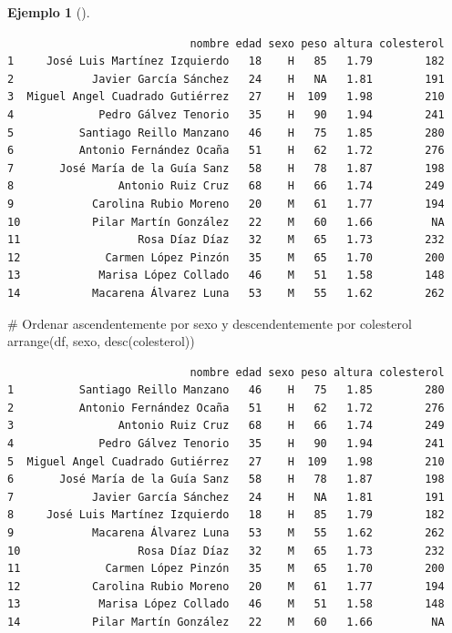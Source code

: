 \documentclass[
  a4paper,
]{scrreport}
\newenvironment{Shaded}{\begin{snugshade}}{\end{snugshade}}
\newcommand{\CommentTok}[1]{\textcolor[rgb]{0.37,0.37,0.37}{#1}}
\newcommand{\FunctionTok}[1]{\textcolor[rgb]{0.28,0.35,0.67}{#1}}
\newcommand{\NormalTok}[1]{\textcolor[rgb]{0.00,0.23,0.31}{#1}}
\theoremstyle{definition}
\theoremstyle{definition}
\newtheorem{example}{Ejemplo}[chapter]
\theoremstyle{remark}
\begin{document}
\begin{example}[]
\begin{verbatim}
                            nombre edad sexo peso altura colesterol
1     José Luis Martínez Izquierdo   18    H   85   1.79        182
2            Javier García Sánchez   24    H   NA   1.81        191
3  Miguel Angel Cuadrado Gutiérrez   27    H  109   1.98        210
4             Pedro Gálvez Tenorio   35    H   90   1.94        241
5          Santiago Reillo Manzano   46    H   75   1.85        280
6          Antonio Fernández Ocaña   51    H   62   1.72        276
7       José María de la Guía Sanz   58    H   78   1.87        198
8                Antonio Ruiz Cruz   68    H   66   1.74        249
9            Carolina Rubio Moreno   20    M   61   1.77        194
10           Pilar Martín González   22    M   60   1.66         NA
11                  Rosa Díaz Díaz   32    M   65   1.73        232
12             Carmen López Pinzón   35    M   65   1.70        200
13            Marisa López Collado   46    M   51   1.58        148
14           Macarena Álvarez Luna   53    M   55   1.62        262
\end{verbatim}

\begin{Shaded}
\begin{Highlighting}[]
\CommentTok{\# Ordenar ascendentemente por sexo y descendentemente por colesterol}
\FunctionTok{arrange}\NormalTok{(df, sexo, }\FunctionTok{desc}\NormalTok{(colesterol))}
\end{Highlighting}
\end{Shaded}

\begin{verbatim}
                            nombre edad sexo peso altura colesterol
1          Santiago Reillo Manzano   46    H   75   1.85        280
2          Antonio Fernández Ocaña   51    H   62   1.72        276
3                Antonio Ruiz Cruz   68    H   66   1.74        249
4             Pedro Gálvez Tenorio   35    H   90   1.94        241
5  Miguel Angel Cuadrado Gutiérrez   27    H  109   1.98        210
6       José María de la Guía Sanz   58    H   78   1.87        198
7            Javier García Sánchez   24    H   NA   1.81        191
8     José Luis Martínez Izquierdo   18    H   85   1.79        182
9            Macarena Álvarez Luna   53    M   55   1.62        262
10                  Rosa Díaz Díaz   32    M   65   1.73        232
11             Carmen López Pinzón   35    M   65   1.70        200
12           Carolina Rubio Moreno   20    M   61   1.77        194
13            Marisa López Collado   46    M   51   1.58        148
14           Pilar Martín González   22    M   60   1.66         NA
\end{verbatim}

\end{example}
\end{document}

